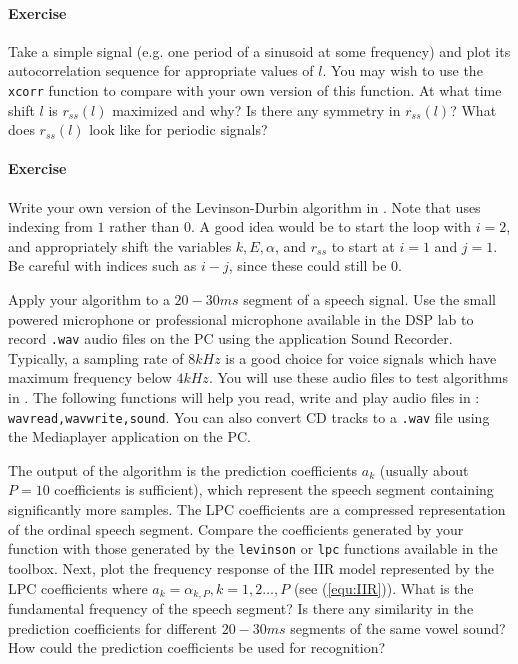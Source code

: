 \paragraph{Exercise}
Take a simple signal (e.g. one period of a sinusoid at some frequency) 
and plot its autocorrelation sequence for appropriate values of $l$.  
You may wish to use the \verb+xcorr+ \matlab function to
compare with your own version of this function.  At what time
shift $l$ is $r_{ss}(l)$ maximized and why?  Is there any
symmetry in $r_{ss}(l)$?  What does $r_{ss}(l)$ look like for
periodic signals?

\paragraph{Exercise}
Write your own version of the Levinson-Durbin algorithm in \matlab.  
Note that \matlab uses indexing from $1$ rather than $0$.  A good idea 
would be to start the loop with $i=2$, and appropriately shift 
the variables $k, E, \alpha$, and $r_{ss}$ to start at $i=1$ and 
$j=1$. Be careful with indices such as $i-j$, since these could 
still be $0$.  

Apply your algorithm to a $20-30ms$ segment of a speech signal.  
Use the small powered microphone or professional microphone
available in the DSP lab to record \verb+.wav+ audio files on the
PC using the application Sound Recorder.  Typically, a
sampling rate of $8kHz$ is a good choice
for voice signals which have maximum
frequency below $4kHz$.  
You will use these audio files to test algorithms in  
\matlab.  The following functions will help you
read, write and play audio files in \matlab:
\verb+wavread,wavwrite,sound+.  You can also convert CD
tracks to a \verb+.wav+ file using the Mediaplayer application
on the PC.

The output of the algorithm is the prediction coefficients $a_k$ 
(usually about $P=10$ coefficients is sufficient), 
which represent the speech segment containing significantly 
more samples.  The LPC coefficients are a compressed representation 
of the ordinal speech segment.  Compare the 
coefficients generated by your function with those generated 
by the \verb+levinson+ or \verb+lpc+ functions available in the 
\matlab toolbox.  Next, plot the frequency response of the IIR model 
represented by the LPC coefficients where 
$a_{k} = \alpha_{k,P}, k=1,2\ldots,P$ (see (\ref{equ:IIR})).  
What is the fundamental frequency of the speech segment?  Is 
there any similarity in the prediction coefficients for 
different $20-30ms$ segments of the same vowel sound? 
How could the prediction coefficients be used for recognition?

